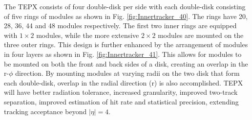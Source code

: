 The TEPX consists of four double-disk per side with each double-disk consisting of five rings of modules as shown in Fig. \ref{fig:Innertracker_40}. The rings have 20, 28, 36, 44 and 48 modules respectively.
The first two inner rings are equipped with \(1 \times 2\) modules, while the more extensive \(2 \times 2\) modules are mounted on the three outer rings. This design is further enhanced by the arrangement of modules in four layers as shown in Fig. \ref{fig:Innertracker_41}. This allows for modules to be mounted on both the front and back sides of a disk, creating an overlap in the r-\(\phi\) direction. By mounting modules at varying radii on the two disk that form each double-disk, overlap in the radial direction (r) is also accomplished. TEPX will have better radiation tolerance, increased granularity, improved two-track separation, improved estimation of hit rate and statistical precision, extending tracking acceptance beyond $|\eta|=4$.





